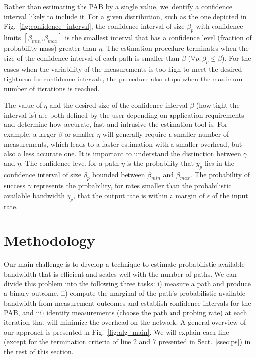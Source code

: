 \documentclass[final,5p,times,twocolumn]{elsarticle}
\begin{document}
Rather than estimating the PAB by a single value, we identify a confidence interval likely to include it.  For a given distribution, such as the one depicted in Fig.~\ref{fig:confidence_interval}, the confidence interval of size $\beta_p$ with confidence limits $[\beta_{min},\beta_{max}]$ is the smallest interval that has a confidence level (fraction of probability mass) greater than $\eta$.  The estimation procedure terminates when the size of the confidence interval of each path is smaller than $\beta$ ($\forall p: \beta_p \leq \beta$).  For the cases when the variability of the measurements is too high to meet the desired tightness for confidence intervals, the procedure also stops when the maximum number of iterations is reached.

The value of $\eta$ and the desired size of the confidence interval $\beta$ (how tight the interval is) are both defined by the user depending on application requirements and determine how accurate, fast and intrusive the estimation tool is.  For example, a larger $\beta$ or smaller $\eta$ will generally require a smaller number of measurements, which leads to a faster estimation with a smaller overhead, but also a less accurate one.  It is important to understand the distinction between $\gamma$ and $\eta$.  The confidence level for a path $\eta$ is the probability that $y_p$ lies in the confidence interval of size $\beta_p$ bounded between $\beta_{min}$ and $\beta_{max}$.  The probability of success $\gamma$ represents the probability, for rates smaller than the probabilistic available bandwidth $y_p$, that the output rate is within a margin of $\epsilon$ of the input rate.

\section{Methodology}
\label{sec:meth}

Our main challenge is to develop a technique to estimate probabilistic available bandwidth that is efficient and scales well with the number of paths.  
We can divide this problem into the following three tasks: i) measure a path and produce a binary outcome, ii) compute the marginal of the path's probabilistic available bandwidth from measurement outcomes and establish confidence intervals for the PAB, and iii) identify  measurements (choose the path and probing rate) at each iteration that will minimize the overhead on the network.  A general overview of our approach is presented in Fig.~\ref{fig:alg_main}.  We will explain each line (except for the termination criteria of line 2 and 7 presented in Sect.~\ref{ssec:ps}) in the rest of this section. 
\end{document}
